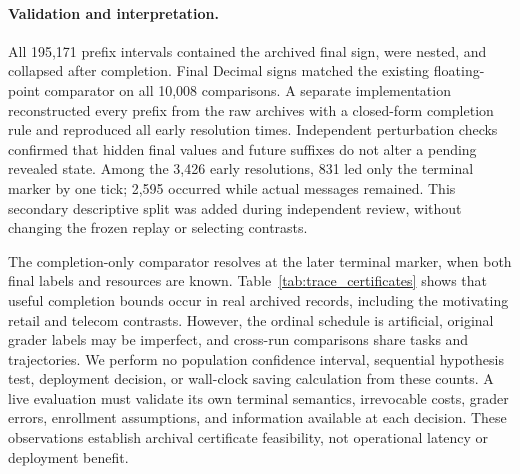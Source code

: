 \paragraph{Validation and interpretation.}
All 195,171 prefix intervals contained the archived final sign, were
nested, and collapsed after completion. Final Decimal signs matched
the existing floating-point comparator on all 10,008 comparisons.
A separate implementation reconstructed every prefix from the raw
archives with a closed-form completion rule and reproduced all early
resolution times. Independent perturbation checks confirmed that hidden
final values and future suffixes do not alter a pending revealed state.
Among the 3,426 early resolutions, 831 led only the terminal
marker by one tick; 2,595 occurred while actual messages remained.
This secondary descriptive split was added during independent review,
without changing the frozen replay or selecting contrasts.

The completion-only comparator resolves at the later terminal marker,
when both final labels and resources are known. Table~\ref{tab:trace_certificates}
shows that useful completion bounds occur in real archived records,
including the motivating retail and telecom contrasts. However, the
ordinal schedule is artificial, original grader labels may be imperfect,
and cross-run comparisons share tasks and trajectories. We perform no
population confidence interval, sequential hypothesis test, deployment
decision, or wall-clock saving calculation from these counts. A live
evaluation must validate its own terminal semantics, irrevocable costs,
grader errors, enrollment assumptions, and information available at each
decision. These observations establish archival certificate feasibility,
not operational latency or deployment benefit.
